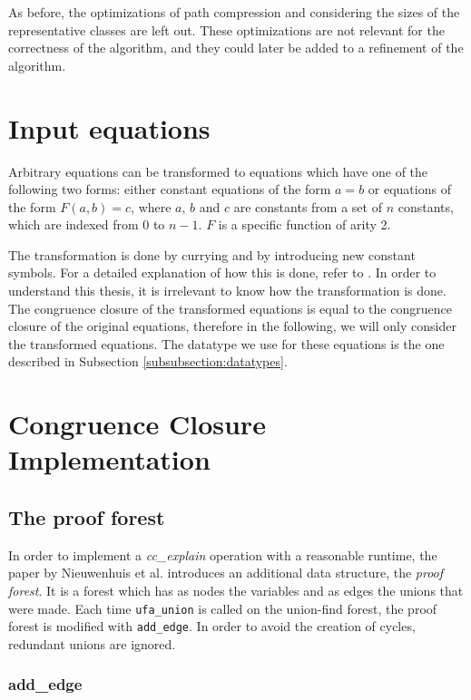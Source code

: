 As before, the optimizations of path compression and considering the sizes of the representative classes are left out. These optimizations are not relevant for the correctness of the algorithm, and they could later be added to a refinement of the algorithm.

\section{Input equations}\label{section:inputequations}

Arbitrary equations can be transformed to equations which have one of the following two forms: either constant equations of the form $a = b$ or equations of the form $F(a,b) = c$, where $a$, $b$ and $c$ are constants from a set of $n$ constants, which are indexed from $0$ to $n-1$. $F$ is a specific function of arity 2.

The transformation is done by currying and by introducing new constant symbols. For a detailed explanation of how this is done, refer to \cite{Nieuwenhuis2}. In order to understand this thesis, it is irrelevant to know how the transformation is done.
The congruence closure of the transformed equations is equal to the congruence closure of the original equations, therefore in the following, we will only consider the transformed equations.
The datatype we use for these equations is the one described in Subsection \ref{subsubsection:datatypes}.

\section{Congruence Closure Implementation}

\subsection{The proof forest}

In order to implement a \emph{cc\_explain} operation with a reasonable runtime, the paper by Nieuwenhuis et al. \cite{Nieuwenhuis} introduces an additional data structure, the \emph{proof forest}. It is a forest which has as nodes the variables and as edges the unions that were made. Each time \lstinline|ufa_union| is called on the union-find forest, the proof forest is modified with \lstinline|add_edge|. In order to avoid the creation of cycles, redundant unions are ignored.

\subsubsection{add\_edge}
\label{subsubsection:addedge}


